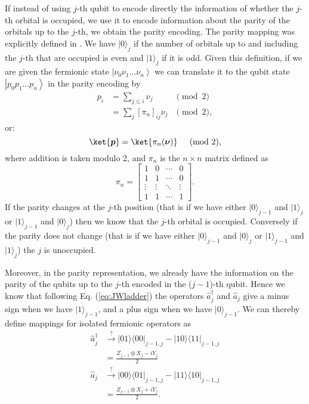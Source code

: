 If instead of using $j$-th qubit to encode directly the information of whether the $j$-th orbital is occupied, we use it to encode information about the parity of the orbitals up to the $j$-th, we obtain the parity encoding. The parity mapping was explicitly defined in \cite{Seeley2012}. We have $|0\rangle_{j}$ if the number of orbitals up to and including the $j$-th that are occupied is even and $|1\rangle_{j}$ if it is odd. Given this definition, if we are given the fermionic state $\left|\nu_{0} \nu_{1} \ldots \nu_{n}\right\rangle$ we can translate it to the qubit state $\left|p_{0} p_{1} \ldots p_{n}\right\rangle$ in the parity encoding by
\begin{equation}
\label{eq:parity1}
\begin{aligned}
p_{i} &= \sum_{j \leq i} \nu_{j} &\pmod 2\\
&= \sum_{j}\left[\pi_{n}\right]_{i j} \nu_{j} &\pmod 2,
\end{aligned}
\end{equation}
or:
\begin{equation}
\label{eq:parity1.1}
\ket{\boldsymbol{p}} =  \ket{\pi_{n}(\boldsymbol{\nu})} \quad \pmod 2,
\end{equation}
where addition is taken modulo 2, and $\pi_{n}$ is the $n \times n$ matrix defined as
\begin{equation}
\label{eq:parity2}
\pi_{n}=\left[\begin{array}{cccc}
1 & 0 & \cdots & 0 \\
1 & 1 & \cdots & 0 \\
\vdots & \vdots & \ddots & \vdots \\
1 & 1 & \cdots & 1
\end{array}\right].
\end{equation}
If the parity changes at the $j$-th position (that is if we have either $|0\rangle_{j - 1}$ and $|1\rangle_{j}$ or $|1\rangle_{j - 1}$ and $|0\rangle_{j}$) then we know that the $j$-th orbital is occupied. Conversely if the parity does not change (that is if we have either $|0\rangle_{j - 1}$ and $|0\rangle_{j}$ or $|1\rangle_{j - 1}$ and $|1\rangle_{j}$) the $j$ is unoccupied. 

Moreover, in the parity representation, we already have the information on the parity of the qubits up to the $j$-th encoded in the ($j - 1$)-th qubit. Hence we know that following Eq. (\ref{eq:JWladder}) the operators $\hat{a}^\dagger_j$ and $\hat{a}_j$ give a minus sign when we have $|1\rangle_{j - 1}$, and a plus sign when we have $|0\rangle_{j - 1}$.  
We can thereby define mappings for isolated fermionic operators as
\begin{equation}
\label{eq:parityladder1}
\begin{aligned}
\hat{a}_{j}^{\dagger} &\xrightarrow{?} |01\rangle \langle 00|_{j-1, j} - |10\rangle \langle 11|_{j-1, j} \\
&=\frac{Z_{j-1} \otimes X_{j} -i Y_{j}}{2} \\
\hat{a}_{j} &\xrightarrow{?} |00\rangle \langle 01|_{j-1, j} - |11\rangle \langle 10|_{j-1, j} \\
&=\frac{Z_{j-1}\otimes X_{j} + i Y_{j}}{2}. 
\end{aligned}
\end{equation}

